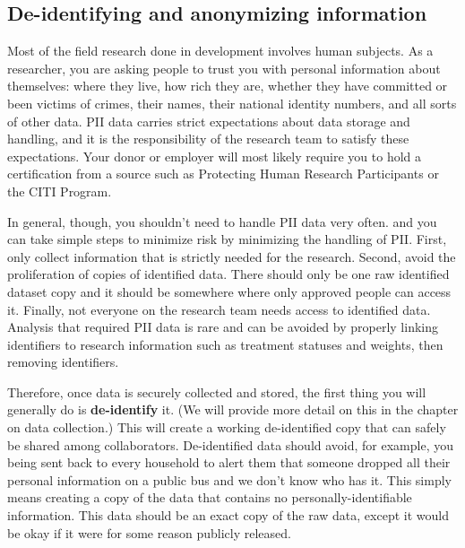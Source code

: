 \subsection{De-identifying and anonymizing information}

Most of the field research done in development involves human subjects.
As a researcher, you are asking people to trust you with personal information about themselves:
where they live, how rich they are, whether they have committed or been victims of crimes,
their names, their national identity numbers, and all sorts of other data.
PII data carries strict expectations about data storage and handling,
and it is the responsibility of the research team to satisfy these expectations.
Your donor or employer will most likely require you to hold a certification from a source
such as Protecting Human Research Participants
or the CITI Program.

In general, though, you shouldn't need to handle PII data very often.
and you can take simple steps to minimize risk by minimizing the handling of PII.
First, only collect information that is strictly needed for the research.
Second, avoid the proliferation of copies of identified data.
There should only be one raw identified dataset copy
and it should be somewhere where only approved people can access it.
Finally, not everyone on the research team needs access to identified data.
Analysis that required PII data is rare
and can be avoided by properly linking identifiers to research information
such as treatment statuses and weights, then removing identifiers.

Therefore, once data is securely collected and stored, the first thing you will generally do is \textbf{de-identify} it.
(We will provide more detail on this in the chapter on data collection.)
This will create a working de-identified copy that can safely be shared among collaborators.
De-identified data should avoid, for example, you being sent back to every household
to alert them that someone dropped all their personal information on a public bus and we don't know who has it.
This simply means creating a copy of the data that contains no personally-identifiable information.
This data should be an exact copy of the raw data,
except it would be okay if it were for some reason publicly released.\cite{matthews2011data}

